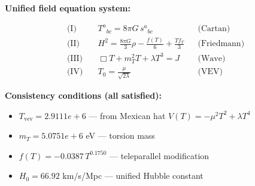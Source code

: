 
\textbf{Unified field equation system:}

\begin{align}
  \text{(I)} \quad & T^a{}_{bc} = 8\pi G \, s^a{}_{bc} && \text{(Cartan)} \\
  \text{(II)} \quad & H^2 = \frac{8\pi G}{3}\rho - \frac{f(T)}{6} + \frac{Tf_T}{3} && \text{(Friedmann)} \\
  \text{(III)} \quad & \Box T + m_T^2 T + \lambda T^3 = J && \text{(Wave)} \\
  \text{(IV)} \quad & T_0 = \frac{\mu}{\sqrt{2\lambda}} && \text{(VEV)}
\end{align}

\textbf{Consistency conditions (all satisfied):}
\begin{itemize}
  \item $T_{\text{vev}} = 2.9111e+6$ — from Mexican hat $V(T) = -\mu^2 T^2 + \lambda T^4$
  \item $m_T = 5.0751e+6$ eV — torsion mass
  \item $f(T) = -0.0387 \, T^{0.1750}$ — teleparallel modification
  \item $H_0 = 66.92$ km/s/Mpc — unified Hubble constant
\end{itemize}